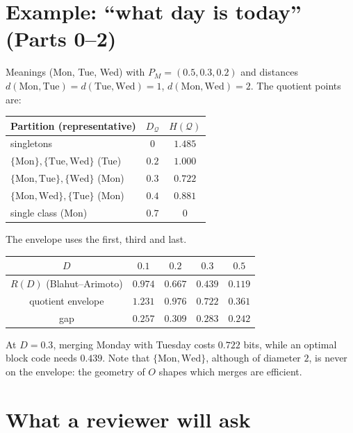 \documentclass[11pt]{article}
\theoremstyle{definition}
\theoremstyle{remark}
\newcommand{\Q}{\mathcal{Q}}
\begin{document}
\section{Example: ``what day is today'' (Parts 0--2)}

Meanings (Mon, Tue, Wed) with $P_M=(0.5,0.3,0.2)$ and distances $d(\text{Mon},\text{Tue})=d(\text{Tue},\text{Wed})=1$, $d(\text{Mon},\text{Wed})=2$. The quotient points are:
\begin{center}
\begin{tabular}{lcc}
\toprule
Partition (representative) & $D_\Q$ & $H(\Q)$\\
\midrule
singletons & $0$ & $1.485$\\
$\{\text{Mon}\},\{\text{Tue},\text{Wed}\}$ (Tue) & $0.2$ & $1.000$\\
$\{\text{Mon},\text{Tue}\},\{\text{Wed}\}$ (Mon) & $0.3$ & $0.722$\\
$\{\text{Mon},\text{Wed}\},\{\text{Tue}\}$ (Mon) & $0.4$ & $0.881$\\
single class (Mon) & $0.7$ & $0$\\
\bottomrule
\end{tabular}
\end{center}
The envelope uses the first, third and last.
\begin{center}
\begin{tabular}{ccccc}
\toprule
$D$ & $0.1$ & $0.2$ & $0.3$ & $0.5$\\
\midrule
$R(D)$ (Blahut--Arimoto) & $0.974$ & $0.667$ & $0.439$ & $0.119$\\
quotient envelope & $1.231$ & $0.976$ & $0.722$ & $0.361$\\
gap & $0.257$ & $0.309$ & $0.283$ & $0.242$\\
\bottomrule
\end{tabular}
\end{center}
At $D=0.3$, merging Monday with Tuesday costs $0.722$ bits, while an optimal block code needs $0.439$. Note that $\{\text{Mon},\text{Wed}\}$, although of diameter $2$, is never on the envelope: the geometry of $O$ shapes which merges are efficient.

\section{What a reviewer will ask}
\end{document}
